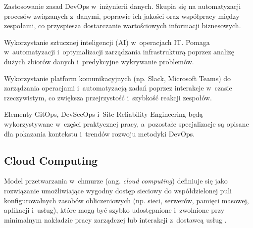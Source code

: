 \begin{description}[style=nextline, font=\bfseries]
    \item[DataOps] Zastosowanie zasad DevOps w~inżynierii danych. Skupia się na automatyzacji procesów związanych z~danymi, poprawie ich jakości oraz współpracy między zespołami, co przyspiesza dostarczanie wartościowych informacji biznesowych.
    \item[AIOps] Wykorzystanie sztucznej inteligencji (AI) w~operacjach IT. Pomaga w~automatyzacji i~optymalizacji zarządzania infrastrukturą poprzez analizę dużych zbiorów danych i~predykcyjne wykrywanie problemów.
    \item[ChatOps] Wykorzystanie platform komunikacyjnych (np. Slack, Microsoft Teams) do zarządzania operacjami i~automatyzacją zadań poprzez interakcje w~czasie rzeczywistym, co zwiększa przejrzystość i~szybkość reakcji zespołów.
\end{description}

Elementy GitOps, DevSecOps i~Site Reliability Engineering będą wykorzystywane w~części praktycznej pracy, a~pozostałe specjalizacje są opisane dla pokazania kontekstu i~trendów rozwoju metodyki DevOps.

\subsection{Cloud Computing}

Model przetwarzania w~chmurze (ang. \textit{cloud computing}) definiuje się jako rozwiązanie umożliwiające wygodny dostęp sieciowy do współdzielonej puli konfigurowalnych zasobów obliczeniowych (np. sieci, serwerów, pamięci masowej, aplikacji i~usług), które mogą być szybko udostępnione i~zwolnione przy minimalnym nakładzie pracy zarządczej lub interakcji z~dostawcą usług \cite{Mell2011NISTCloudDefinition}.

